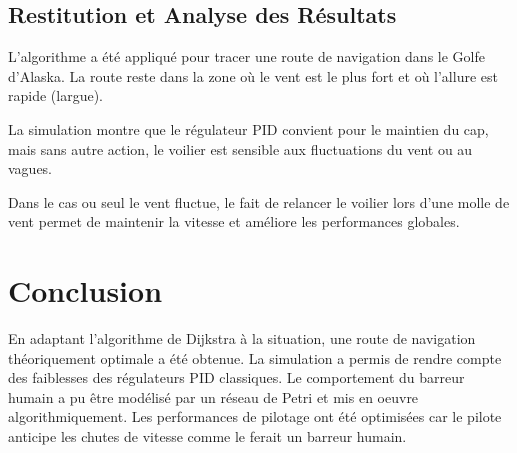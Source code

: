 \documentclass[12pt,a4paper]{article}
\begin{document}
\subsection{Restitution et Analyse des Résultats}

	L'algorithme a été appliqué pour tracer une route de navigation dans le Golfe d'Alaska. La route reste dans la zone où le vent est le plus fort et où l'allure est rapide (largue).
	
	La simulation montre que le régulateur PID convient pour le maintien du cap, mais sans autre action, le voilier est sensible aux fluctuations du vent ou au vagues.
	
	Dans le cas ou seul le vent fluctue, le fait de relancer le voilier lors d'une molle de vent permet de maintenir la vitesse et améliore les performances globales.
	
\section{Conclusion}

	En adaptant l'algorithme de Dijkstra à la situation, une route de navigation théoriquement optimale a été obtenue. La simulation a permis de rendre compte des faiblesses des régulateurs PID classiques. Le comportement du barreur humain a pu être modélisé par un réseau de Petri et mis en oeuvre algorithmiquement. Les performances de pilotage ont été optimisées car le pilote anticipe les chutes de vitesse comme le ferait un barreur humain.
	
	
	
\end{document}
